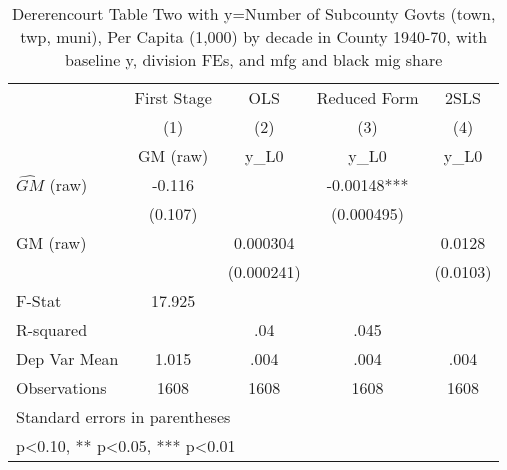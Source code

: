 \begin{table}[htbp]\centering
\def\sym#1{\ifmmode^{#1}\else\(^{#1}\)\fi}
\caption{Dererencourt Table Two with y=Number of Subcounty Govts (town, twp, muni), Per Capita (1,000) by decade in County 1940-70, with baseline y, division FEs, and mfg and black mig share}
\begin{tabular}{l*{4}{c}}
\toprule
                    & First Stage   &         OLS   &Reduced Form   &        2SLS   \\
                    &\multicolumn{1}{c}{(1)}&\multicolumn{1}{c}{(2)}&\multicolumn{1}{c}{(3)}&\multicolumn{1}{c}{(4)}\\
                    &\multicolumn{1}{c}{GM  (raw)}&\multicolumn{1}{c}{y\_L0}&\multicolumn{1}{c}{y\_L0}&\multicolumn{1}{c}{y\_L0}\\
\midrule
$\hat{GM}$ (raw)    &      -0.116   &               &    -0.00148***&               \\
                    &     (0.107)   &               &  (0.000495)   &               \\
\addlinespace
GM  (raw)           &               &    0.000304   &               &      0.0128   \\
                    &               &  (0.000241)   &               &    (0.0103)   \\
\midrule
F-Stat              &      17.925   &               &               &               \\
R-squared           &               &         .04   &        .045   &               \\
Dep Var Mean        &       1.015   &        .004   &        .004   &        .004   \\
Observations        &        1608   &        1608   &        1608   &        1608   \\
\bottomrule
\multicolumn{5}{l}{\footnotesize Standard errors in parentheses}\\
\multicolumn{5}{l}{\footnotesize * p<0.10, ** p<0.05, *** p<0.01}\\
\end{tabular}
\end{table}
